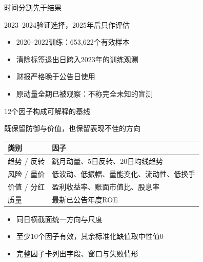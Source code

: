 \documentclass[aspectratio=169,10pt]{beamer}
\begin{document}
\begin{frame}{时间分割先于结果}
\begin{block}{}2023–2024验证选择，2025年后只作评估\end{block}
\small\begin{itemize}
\item 2020–2022训练：653,622个有效样本
\item 清除标签退出日跨入2023年的训练观测
\item 财报严格晚于公告日使用
\item 原动量全期已被观察：不称完全未知的盲测
\end{itemize}
\end{frame}

\begin{frame}{12个因子构成可解释的基线}
\begin{block}{}既保留防御与价值，也保留表现不佳的方向\end{block}
\begin{center}\small\begin{tabularx}{.96\textwidth}{lX}\toprule
类别 & 因子\\\midrule
趋势 / 反转 & 跳月动量、5日反转、20日均线趋势\\
风险 / 量价 & 低波动、低振幅、量能变化、流动性、低换手\\
价值 / 分红 & 盈利收益率、账面市值比、股息率\\
质量 & 最新已公告年度ROE\\
\bottomrule\end{tabularx}\end{center}
\small\begin{itemize}
\item 同日横截面统一方向与尺度
\item 至少10个因子有效，其余标准化缺值取中性值0
\item 完整因子卡列出字段、窗口与失败情形
\end{itemize}
\end{frame}
\end{document}
